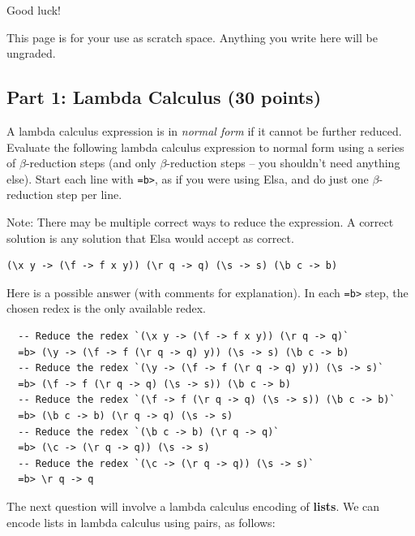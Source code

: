 \documentclass[addpoints]{exam}
\begin{document}
\begin{coverpages}
\bigskip

\noindent Good luck!

\newpage

This page is for your use as scratch space. Anything you write here will be ungraded.

\newpage  

\end{coverpages}

\begin{questions}

\subsection*{\textbf{Part 1: Lambda Calculus} (30 points)}

\question[6] A lambda calculus expression is in \emph{normal form} if it cannot be further reduced.  Evaluate the following lambda calculus expression to normal form using a series of $\beta$-reduction steps (and only $\beta$-reduction steps -- you shouldn't need anything else).  Start each line with \texttt{=b>}, as if you were using Elsa, and do just one $\beta$-reduction step per line.

Note: There may be multiple correct ways to reduce the expression.  A correct solution is any solution that Elsa would accept as correct.

\begin{verbatim}
(\x y -> (\f -> f x y)) (\r q -> q) (\s -> s) (\b c -> b)
\end{verbatim}
\begin{solutionorbox}[\stretch{1}]
Here is a possible answer (with comments for explanation). In each \verb|=b>| step, the chosen redex is the only available redex.  
\begin{verbatim}
  -- Reduce the redex `(\x y -> (\f -> f x y)) (\r q -> q)`
  =b> (\y -> (\f -> f (\r q -> q) y)) (\s -> s) (\b c -> b)
  -- Reduce the redex `(\y -> (\f -> f (\r q -> q) y)) (\s -> s)`
  =b> (\f -> f (\r q -> q) (\s -> s)) (\b c -> b)
  -- Reduce the redex `(\f -> f (\r q -> q) (\s -> s)) (\b c -> b)`
  =b> (\b c -> b) (\r q -> q) (\s -> s)
  -- Reduce the redex `(\b c -> b) (\r q -> q)`
  =b> (\c -> (\r q -> q)) (\s -> s)
  -- Reduce the redex `(\c -> (\r q -> q)) (\s -> s)`
  =b> \r q -> q
\end{verbatim}
\end{solutionorbox}

\newpage

The next question will involve a lambda calculus encoding of \textbf{lists}.  We can encode lists in lambda calculus using pairs, as follows:


\end{questions}
\end{document}
